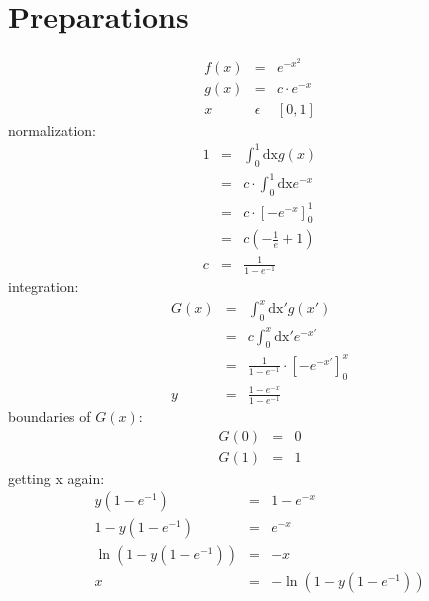 \documentclass{article}
\begin{document}
\section{Preparations}
	\begin{eqnarray*}
		f(x)&=&e^{-x^2}\\
		g(x)&=&c\cdot e^{-x}\\
		x &\epsilon& [0,1]
	\end{eqnarray*}
	normalization:
	\begin{eqnarray*}
		1&=&\int_0^1 \mathrm{dx}g(x)\\
		&=&c\cdot\int_0^1 \mathrm{dx}e^{-x}\\
		&=&c\cdot\left[-e^{-x}\right]_0^1\\
		&=&c\left(-\frac{1}{e}+1\right)\\
		c&=&\frac{1}{1-e^{-1}}
	\end{eqnarray*}
	integration:
	\begin{eqnarray*}
		G(x)&=&\int_0^x\mathrm{dx'}g(x')\\
		&=&c\int_0^x\mathrm{dx'}e^{-x'}\\				&=&\frac{1}{1-e^{-1}}\cdot\left[-e^{-x'}\right]_0^x\\
		y&=&\frac{1-e^{-x}}{1-e^{-1}}
	\end{eqnarray*}
	boundaries of $G(x)$:
	\begin{eqnarray*}
		G(0)&=&0\\
		G(1)&=&1
	\end{eqnarray*}
	getting x again:
	\begin{eqnarray*}
		y(1-e^{-1})&=&1-e^{-x}\\
		1-y(1-e^{-1})&=&e^{-x}\\
		\ln(1-y(1-e^{-1}))&=&-x\\
		x&=&-\ln(1-y(1-e^{-1}))
	\end{eqnarray*}
\end{document}
